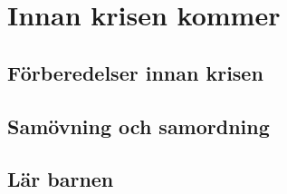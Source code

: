 
\section{Innan krisen kommer}

\subsection{Förberedelser innan krisen}

\subsection{Samövning och samordning}

\subsection{Lär barnen}